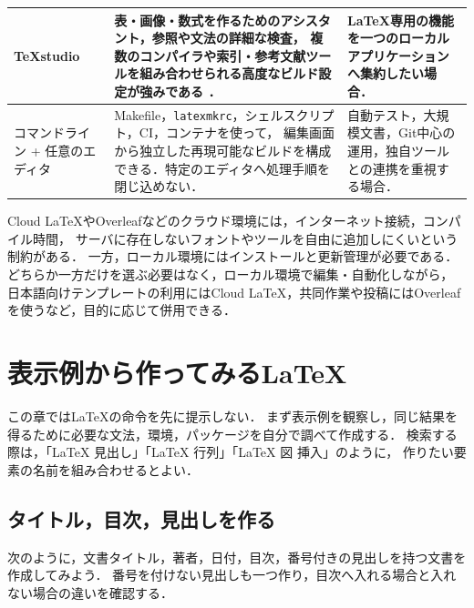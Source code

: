\documentclass[a4paper,11pt]{jsarticle}
\newcommand{\code}[1]{\texttt{#1}}
\begin{document}
\begin{longtable}{|>{\raggedright\arraybackslash}p{34mm}
                  |>{\raggedright\arraybackslash}p{70mm}
                  |>{\raggedright\arraybackslash}p{43mm}|}
  TeXstudio
  & 表・画像・数式を作るためのアシスタント，参照や文法の詳細な検査，
    複数のコンパイラや索引・参考文献ツールを組み合わせられる高度なビルド設定が強みである
    \cite{texstudio}．
  & LaTeX専用の機能を一つのローカルアプリケーションへ集約したい場合． \\
  \hline

  コマンドライン + 任意のエディタ
  & Makefile，\code{latexmkrc}，シェルスクリプト，CI，コンテナを使って，
    編集画面から独立した再現可能なビルドを構成できる．特定のエディタへ処理手順を閉じ込めない．
  & 自動テスト，大規模文書，Git中心の運用，独自ツールとの連携を重視する場合． \\
  \hline
\end{longtable}

Cloud LaTeXやOverleafなどのクラウド環境には，インターネット接続，コンパイル時間，
サーバに存在しないフォントやツールを自由に追加しにくいという制約がある．
一方，ローカル環境にはインストールと更新管理が必要である．
どちらか一方だけを選ぶ必要はなく，ローカル環境で編集・自動化しながら，
日本語向けテンプレートの利用にはCloud LaTeX，共同作業や投稿にはOverleafを使うなど，目的に応じて併用できる．

\section{表示例から作ってみるLaTeX}

この章ではLaTeXの命令を先に提示しない．
まず表示例を観察し，同じ結果を得るために必要な文法，環境，パッケージを自分で調べて作成する．
検索する際は，「LaTeX 見出し」「LaTeX 行列」「LaTeX 図 挿入」のように，
作りたい要素の名前を組み合わせるとよい．

\subsection{タイトル，目次，見出しを作る}

次のように，文書タイトル，著者，日付，目次，番号付きの見出しを持つ文書を作成してみよう．
番号を付けない見出しも一つ作り，目次へ入れる場合と入れない場合の違いを確認する．
\end{document}
